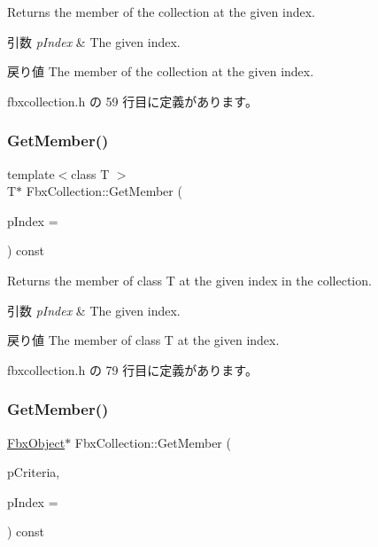 Returns the member of the collection at the given index. 
\begin{DoxyParams}{引数}
{\em p\+Index} & The given index. \\
\hline
\end{DoxyParams}
\begin{DoxyReturn}{戻り値}
The member of the collection at the given index. 
\end{DoxyReturn}


 fbxcollection.\+h の 59 行目に定義があります。

\mbox{\label{class_fbx_collection_a36af3c2dc008c0c6261ff29b492eaee0}} 
\subsubsection{\texorpdfstring{Get\+Member()}{GetMember()}\hspace{0.1cm}{\footnotesize\ttfamily [2/3]}}
{\footnotesize\ttfamily template$<$class T $>$ \\
T$\ast$ Fbx\+Collection\+::\+Get\+Member (\begin{DoxyParamCaption}\item[{int}]{p\+Index = {} }\end{DoxyParamCaption}) const\hspace{0.3cm}{\ttfamily [inline]}}

Returns the member of class T at the given index in the collection. 
\begin{DoxyParams}{引数}
{\em p\+Index} & The given index. \\
\hline
\end{DoxyParams}
\begin{DoxyReturn}{戻り値}
The member of class T at the given index. 
\end{DoxyReturn}


 fbxcollection.\+h の 79 行目に定義があります。

\mbox{\label{class_fbx_collection_a0734fa6462dbc0926b610dfc6047252e}} 
\subsubsection{\texorpdfstring{Get\+Member()}{GetMember()}\hspace{0.1cm}{\footnotesize\ttfamily [3/3]}}
{\footnotesize\ttfamily \hyperlink{class_fbx_object}{Fbx\+Object}$\ast$ Fbx\+Collection\+::\+Get\+Member (\begin{DoxyParamCaption}\item[{const \hyperlink{class_fbx_criteria}{Fbx\+Criteria} \&}]{p\+Criteria,  }\item[{int}]{p\+Index = {} }\end{DoxyParamCaption}) const\hspace{0.3cm}{\ttfamily [inline]}}

